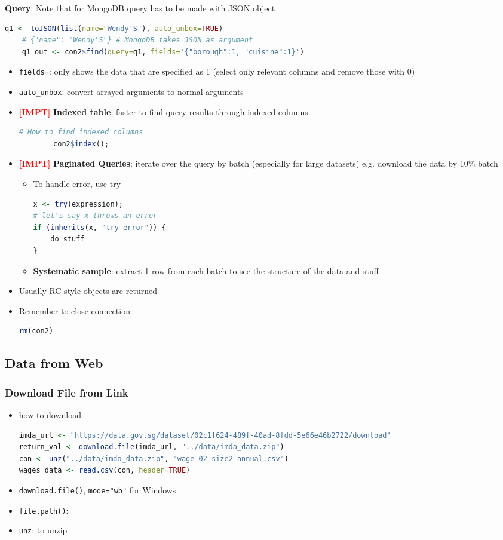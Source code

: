 \documentclass{article}
\newcommand{\impt}[0]{\textcolor{red}{\textbf{[IMPT] }}}
\begin{document}
\begin{multicols}{2}
\textbf{Query}: Note that for MongoDB query has to be made with JSON object
\begin{lstlisting}[language=R]
	q1 <- toJSON(list(name="Wendy'S"), auto_unbox=TRUE)
	# {"name": "Wendy'S"} # MongoDB takes JSON as argument
	q1_out <- con2$find(query=q1, fields='{"borough":1, "cuisine":1}')
\end{lstlisting}
\begin{itemize}
	\item \texttt{fields=}: only shows the data that are specified as 1 (select only relevant columns and remove those with 0)
	\item \texttt{auto\_unbox}: convert arrayed arguments to normal arguments
	\item \impt \textbf{Indexed table}: faster to find query results through indexed columns
	\begin{lstlisting}[language=R]
		# How to find indexed columns
		con2$index();\end{lstlisting}
	\item \impt \textbf{Paginated Queries}: iterate over the query by batch (especially for large datasets) e.g. download the data by 10\% batch
	\begin{itemize}
		\item To handle error, use try
		\begin{lstlisting}[language=R]
x <- try(expression);
# let's say x throws an error
if (inherits(x, "try-error")) {
	do stuff
}\end{lstlisting}
        \item \textbf{Systematic sample}: extract 1 row from each batch to see the structure of the data and stuff
	\end{itemize}
    \item Usually RC style objects are returned
    \item Remember to close connection
    \begin{lstlisting}[language=R]
rm(con2)\end{lstlisting}
\end{itemize}
\subsection{Data from Web}

\subsubsection{Download File from Link}
\begin{itemize}
	\item how to download
	\begin{lstlisting}[language=R]
imda_url <- "https://data.gov.sg/dataset/02c1f624-489f-40ad-8fdd-5e66e46b2722/download"
return_val <- download.file(imda_url, "../data/imda_data.zip")
con <- unz("../data/imda_data.zip", "wage-02-size2-annual.csv")
wages_data <- read.csv(con, header=TRUE)\end{lstlisting}
	\item \texttt{download.file()}, \texttt{mode="wb"} for Windows
	\item \texttt{file.path()}:
	\item \texttt{unz}: to unzip
\end{itemize}

\end{multicols}
\end{document}

